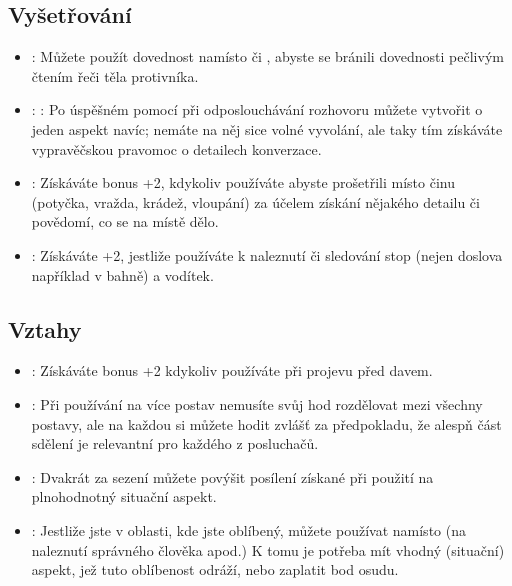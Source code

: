 \subsection{Vyšetřování}
\label{sec:trik-vysetrovani}
\begin{itemize}

\item{}:
\label{sec:vysetrovani-mikro}
Můžete použít dovednost  namísto  či , abyste se bránili dovednosti  pečlivým čtením řeči těla protivníka.

\item{}:
\label{sec:vysetrovani-fizlovani}:
Po úspěšném  pomocí  při odposlouchávání rozhovoru můžete vytvořit o jeden aspekt navíc; nemáte na něj sice volné vyvolání, ale taky tím získáváte vypravěčskou pravomoc o detailech konverzace.


\item{}:
\label{sec:vysetrovani-detektiv}
Získáváte bonus +2, kdykoliv používáte  abyste prošetřili místo činu (potyčka, vražda, krádež, vloupání) za účelem získání nějakého detailu či povědomí, co se na místě dělo.

\item{}:
\label{vysetrovani-stopovani}
Získáváte +2, jestliže používáte  k naleznutí či sledování stop (nejen doslova například v bahně) a vodítek.

\end{itemize}
\subsection{Vztahy}
\label{sec:trik-vztahy}
\begin{itemize}

\item{}:
  \label{sec:vztahy-demgagog}
  Získáváte bonus +2 kdykoliv používáte  při projevu před davem.

\item{}:
  \label{sec:vztahy-individual}
  Při používání  na více postav nemusíte svůj hod rozdělovat mezi všechny postavy, ale na každou si můžete hodit zvlášť za předpokladu, že alespň část sdělení je relevantní pro každého z posluchačů.

\item{}:
  \label{sec:vztahy-piti}
  Dvakrát za sezení můžete povýšit posílení získané při použití  na plnohodnotný situační aspekt.

\item{}:
  \label{sec:vztahy-popularni}
  Jestliže jste v oblasti, kde jste oblíbený, můžete používat  namísto  (na naleznutí správného člověka apod.) K tomu je potřeba mít vhodný (situační) aspekt, jež tuto oblíbenost odráží, nebo zaplatit bod osudu.
  
\end{itemize}

